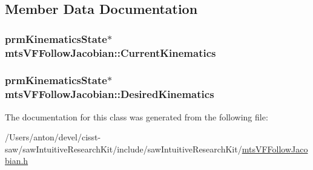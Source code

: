 \subsection{Member Data Documentation}
\hypertarget{classmts_v_f_follow_jacobian_aa671c9c1e5c7e8945535b49ffe479765}{}
\subsubsection[{Current\+Kinematics}]{\setlength{\rightskip}{0pt plus 5cm}prm\+Kinematics\+State$\ast$ mts\+V\+F\+Follow\+Jacobian\+::\+Current\+Kinematics}\label{classmts_v_f_follow_jacobian_aa671c9c1e5c7e8945535b49ffe479765}
\hypertarget{classmts_v_f_follow_jacobian_a5b06bdfc990f1affa05a8178a1623068}{}
\subsubsection[{Desired\+Kinematics}]{\setlength{\rightskip}{0pt plus 5cm}prm\+Kinematics\+State$\ast$ mts\+V\+F\+Follow\+Jacobian\+::\+Desired\+Kinematics}\label{classmts_v_f_follow_jacobian_a5b06bdfc990f1affa05a8178a1623068}


The documentation for this class was generated from the following file\+:\begin{DoxyCompactItemize}
\item 
/\+Users/anton/devel/cisst-\/saw/saw\+Intuitive\+Research\+Kit/include/saw\+Intuitive\+Research\+Kit/\hyperlink{mts_v_f_follow_jacobian_8h}{mts\+V\+F\+Follow\+Jacobian.\+h}\end{DoxyCompactItemize}
